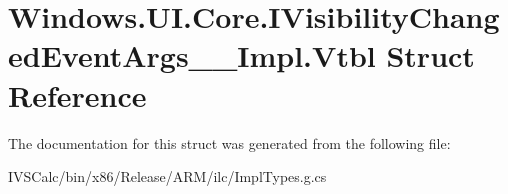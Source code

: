 \hypertarget{struct_windows_1_1_u_i_1_1_core_1_1_i_visibility_changed_event_args_____impl_1_1_vtbl}{}\section{Windows.\+U\+I.\+Core.\+I\+Visibility\+Changed\+Event\+Args\+\_\+\+\_\+\+Impl.\+Vtbl Struct Reference}
\label{struct_windows_1_1_u_i_1_1_core_1_1_i_visibility_changed_event_args_____impl_1_1_vtbl}


The documentation for this struct was generated from the following file\+:\begin{DoxyCompactItemize}
\item 
I\+V\+S\+Calc/bin/x86/\+Release/\+A\+R\+M/ilc/Impl\+Types.\+g.\+cs\end{DoxyCompactItemize}
